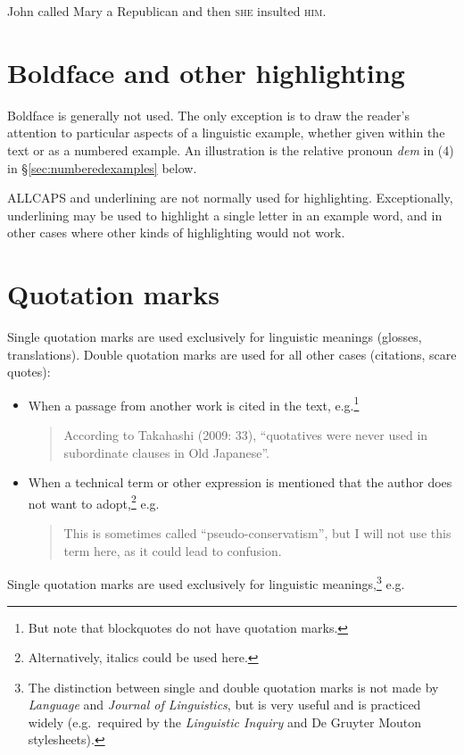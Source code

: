 \documentclass[a4paper]{article}
\newcommand{\sectref}[1]{§\ref{#1}}
\newenvironment{gsrexq}{\begin{quote}\color{blue}}{\end{quote}}
\newcommand{\eagsr}{\bgroup\color{blue}\ea}
\newcommand{\zgsr}{\z\egroup}
\begin{document}
\eagsr
  John called Mary a Republican and then \textsc{she} insulted \textsc{him}.
\zgsr

\section{Boldface and other
highlighting}\label{sec:boldface-and-other-highlighting}

Boldface is generally not used. The only exception is to draw the
reader's attention to particular aspects of a linguistic example,
whether given within the text or as a numbered example. An illustration
is the relative pronoun \textit{dem} in (4) in \sectref{sec:numberedexamples} below. 

ALLCAPS and
underlining are not normally used for highlighting. Exceptionally,
underlining may be used to highlight a single letter in an example word,
and in other cases where other kinds of highlighting would not work.

\section{Quotation marks}\label{sec:quotation-marks}

Single quotation marks are used exclusively for linguistic meanings
(glosses, translations). Double quotation marks are used for all other
cases (citations, scare quotes):

\begin{itemize}
\item  When a passage from another work is cited in the text, e.g.\footnote{But note that blockquotes do not have quotation marks.}
    \begin{gsrexq} 
      According to Takahashi (2009: 33), ``quotatives were never used in subordinate clauses in Old Japanese''.
    \end{gsrexq}
\item When a technical term or other expression is mentioned that the author does not want to adopt,\footnote{Alternatively, italics could be used here.} e.g.
    \begin{gsrexq}
      This is sometimes called ``pseudo-conservatism'', but I will not use this term here, as it could lead to confusion.
    \end{gsrexq}
\end{itemize}

Single quotation marks are used exclusively for
linguistic meanings,\footnote{The distinction between single and double
quotation marks is not made by \textit{Language} and \textit{Journal of Linguistics}, but
is very useful and is practiced widely (e.g.~required by the \textit{Linguistic
Inquiry} and De Gruyter Mouton stylesheets).} e.g.
\end{document}
